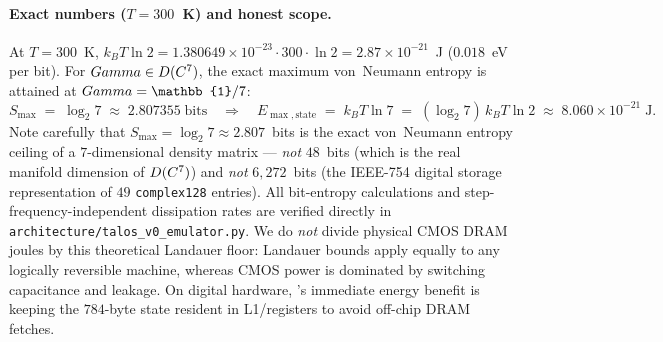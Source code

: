 \paragraph{Exact numbers ($T=300$~K) and honest scope.}
At $T=300$~K, $k_B T\ln 2 = 1.380649\!\times\!10^{-23}\cdot 300\cdot\ln 2
= 2.87\times 10^{-21}$~J ($0.018$~eV per bit). For $Gamma\in D(C^7)$,
the exact maximum von~Neumann entropy is attained at $\Gam=\mathbb{1}/7$:
\[
S_{\max} \;=\; \log_2 7 \;\approx\; 2.807355\;\text{bits}
\quad\Longrightarrow\quad
E_{\max,\text{state}} \;=\; k_B T\ln 7 \;=\; (\log_2 7)\,k_B T\ln 2
\;\approx\; 8.060\times 10^{-21}\;\text{J}.
\]
Note carefully that $S_{\max}=\log_2 7\approx 2.807$~bits is the exact
von~Neumann entropy ceiling of a $7$-dimensional density matrix --- \emph{not}
$48$~bits (which is the real manifold dimension of $D(C^7)$) and
\emph{not} $6{,}272$~bits (the IEEE-754 digital storage representation of
$49$ \texttt{complex128} entries). All bit-entropy calculations and
step-frequency-independent dissipation rates are verified directly in
\texttt{architecture/talos\_v0\_emulator.py}. We do \emph{not} divide physical
CMOS DRAM joules by this theoretical Landauer floor: Landauer bounds apply
equally to any logically reversible machine, whereas CMOS power is dominated by
switching capacitance and leakage. On digital hardware, \TALOS{}'s immediate
energy benefit is keeping the $784$-byte state resident in L1/registers to
avoid off-chip DRAM fetches.

